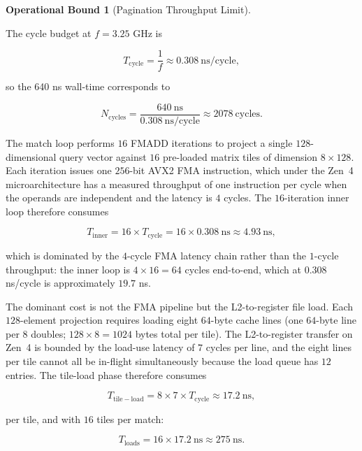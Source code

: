 \documentclass[10pt,twocolumn]{article}
\theoremstyle{definition}
\newtheorem{operationalbound}[theorem]{Operational Bound}
\theoremstyle{remark}
\begin{document}
\begin{operationalbound}[Pagination Throughput Limit]
\begin{description}
The cycle budget at $f = 3.25$ GHz is

\begin{equation}
T_{\mathrm{cycle}} = \frac{1}{f} \approx 0.308~\mathrm{ns/cycle},
\label{eq:cycle-budget}
\end{equation}

so the 640 ns wall-time corresponds to

\begin{equation}
N_{\mathrm{cycles}} = \frac{640~\mathrm{ns}}{0.308~\mathrm{ns/cycle}} \approx 2078~\mathrm{cycles}.
\label{eq:cycle-count}
\end{equation}

The match loop performs $16$ FMADD iterations to project a single
$128$-dimensional query vector against $16$ pre-loaded matrix tiles
of dimension $8 \times 128$. Each iteration issues one $256$-bit
AVX2 FMA instruction, which under the Zen~4 microarchitecture has
a measured throughput of one instruction per cycle when the
operands are independent and the latency is $4$ cycles. The
$16$-iteration inner loop therefore consumes

\begin{equation}
T_{\mathrm{inner}} = 16 \times T_{\mathrm{cycle}} = 16 \times 0.308~\mathrm{ns} \approx 4.93~\mathrm{ns},
\label{eq:inner-loop}
\end{equation}

which is dominated by the $4$-cycle FMA latency chain rather than
the $1$-cycle throughput: the inner loop is $4 \times 16 = 64$
cycles end-to-end, which at $0.308$ ns/cycle is approximately
$19.7$ ns.

The dominant cost is not the FMA pipeline but the L2-to-register
file load. Each $128$-element projection requires loading eight
$64$-byte cache lines (one $64$-byte line per $8$ doubles; $128
\times 8 = 1024$ bytes total per tile). The L2-to-register transfer
on Zen~4 is bounded by the load-use latency of $7$ cycles per line,
and the eight lines per tile cannot all be in-flight simultaneously
because the load queue has $12$ entries. The tile-load phase
therefore consumes

\begin{equation}
T_{\mathrm{tile-load}} = 8 \times 7 \times T_{\mathrm{cycle}} \approx 17.2~\mathrm{ns},
\label{eq:tile-load}
\end{equation}

per tile, and with $16$ tiles per match:

\begin{equation}
T_{\mathrm{loads}} = 16 \times 17.2~\mathrm{ns} \approx 275~\mathrm{ns}.
\label{eq:total-loads}
\end{equation}


\end{description}
\end{operationalbound}
\end{document}
